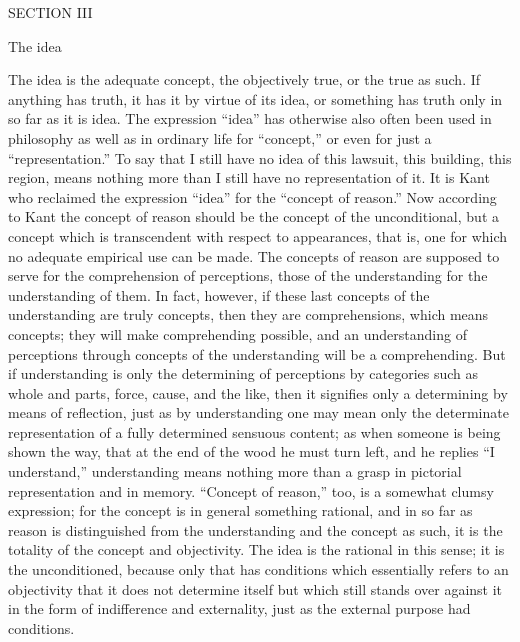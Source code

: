 SECTION III

The idea

The idea is the adequate concept,
the objectively true,
or the true as such.
If anything has truth,
it has it by virtue of its idea,
or something has truth only
in so far as it is idea.
The expression “idea” has otherwise also often been used
in philosophy as well as in ordinary life for “concept,”
or even for just a “representation.”
To say that I still have no idea of
this lawsuit, this building, this region,
means nothing more than I still have no representation of it.
It is Kant who reclaimed the expression “idea”
for the “concept of reason.”
Now according to Kant the concept of reason
should be the concept of the unconditional,
but a concept which is transcendent with respect to appearances,
that is, one for which no adequate empirical use can be made.
The concepts of reason are supposed to serve
for the comprehension of perceptions,
those of the understanding for the understanding of them.
In fact, however, if these last
concepts of the understanding are truly concepts,
then they are comprehensions, which means concepts;
they will make comprehending possible,
and an understanding of perceptions
through concepts of the understanding
will be a comprehending.
But if understanding is only
the determining of perceptions by categories
such as whole and parts, force, cause, and the like,
then it signifies only a determining by means of reflection,
just as by understanding one may mean only the determinate
representation of a fully determined sensuous content;
as when someone is being shown the way, that at the end of the
wood he must turn left, and he replies “I understand,”
understanding means nothing more than a grasp
in pictorial representation and in memory.
“Concept of reason,” too, is a somewhat clumsy expression;
for the concept is in general something rational,
and in so far as reason is distinguished
from the understanding and the concept as such,
it is the totality of the concept and objectivity.
The idea is the rational in this sense;
it is the unconditioned,
because only that has conditions
which essentially refers to an objectivity
that it does not determine itself
but which still stands over against it
in the form of indifference and externality,
just as the external purpose had conditions.

